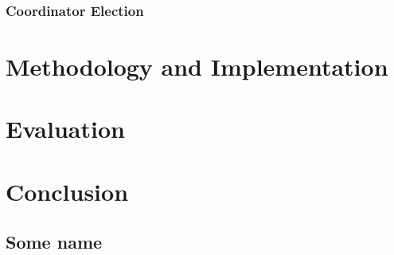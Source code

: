 		\subsection*{Coordinator Election}
	

\chapter{Methodology and Implementation}

	
	
	
	
	
	
\chapter{Evaluation}



\chapter{Conclusion}

\clearpage
\renewcommand{\bibname}{References} %
\printbibliography[heading=bibintoc] %

\begin{appendices}
	\chapter{Some name}
	\lipsum[3]
\end{appendices}

